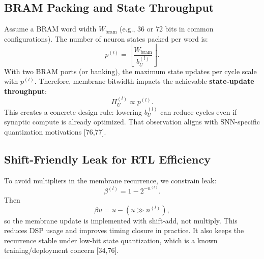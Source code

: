 \documentclass[10pt,journal,compsoc]{IEEEtran}
\begin{document}
\subsection{BRAM Packing and State Throughput}
Assume a BRAM word width $W_{\text{bram}}$ (e.g., 36 or 72 bits in common configurations). The number of neuron states packed per word is:
\begin{equation}
p^{(l)} = \left\lfloor \frac{W_{\text{bram}}}{b_U^{(l)}} \right\rfloor.
\end{equation}
With two BRAM ports (or banking), the maximum state updates per cycle scale with $p^{(l)}$. Therefore, membrane bitwidth impacts the achievable \textbf{state-update throughput}:
\begin{equation}
\Pi_{U}^{(l)} \propto p^{(l)}.
\end{equation}
This creates a concrete design rule: lowering $b_U^{(l)}$ can reduce cycles even if synaptic compute is already optimized. That observation aligns with SNN-specific quantization motivations [76,77].

\subsection{Shift-Friendly Leak for RTL Efficiency}
To avoid multipliers in the membrane recurrence, we constrain leak:
\begin{equation}
\beta^{(l)} = 1 - 2^{-n^{(l)}}.
\end{equation}
Then
\begin{equation}
\beta u = u - (u \gg n^{(l)}),
\end{equation}
so the membrane update is implemented with shift-add, not multiply. This reduces DSP usage and improves timing closure in practice. It also keeps the recurrence stable under low-bit state quantization, which is a known training/deployment concern [34,76].
\end{document}

